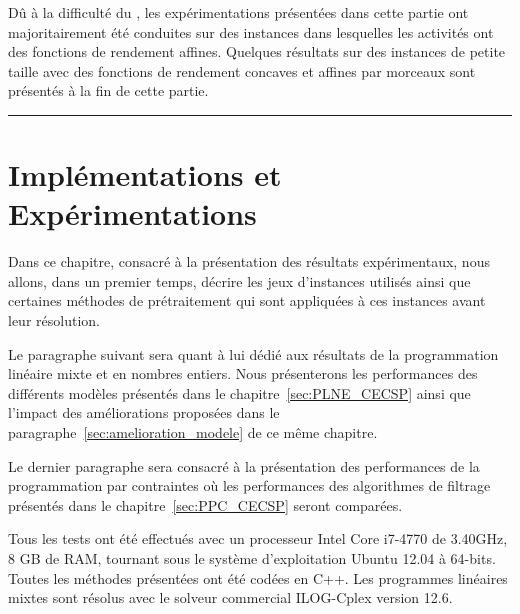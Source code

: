 \begin{center}
\begin{minipage}{\textwidth}
{    Dû à la difficulté du \CECSP, les expérimentations présentées
    dans cette partie ont majoritairement été conduites sur des
    instances dans lesquelles les activités ont des fonctions de
    rendement affines. Quelques résultats sur des instances de petite
    taille avec des fonctions de rendement concaves et affines par
    morceaux sont présentés à la fin de cette partie.}
    \vspace{0.5cm}
    \hrule
  \end{minipage}
\end{center}

\chapter{Implémentations et Expérimentations}
\label{sec:expe}

Dans ce chapitre, consacré à la présentation des résultats
expérimentaux, nous allons, dans un premier temps, décrire les
jeux d'instances utilisés ainsi que certaines méthodes de
prétraitement qui sont appliquées à ces instances avant leur
résolution. 

Le paragraphe suivant sera quant à lui dédié aux résultats de la
programmation linéaire mixte et en nombres entiers. Nous présenterons
les performances des différents modèles présentés dans le
chapitre~\ref{sec:PLNE_CECSP} ainsi que l'impact des améliorations
proposées dans le paragraphe~\ref{sec:amelioration_modele} de ce même
chapitre. 

Le dernier paragraphe sera consacré à la présentation des performances
de la programmation par contraintes où les performances des
algorithmes de filtrage présentés dans le chapitre~\ref{sec:PPC_CECSP}
seront comparées. 

Tous les tests ont été effectués avec un processeur Intel Core i7-4770
de 3.40GHz, 8 GB de RAM, tournant sous le système d’exploitation
Ubuntu 12.04 à 64-bits. Toutes les méthodes présentées ont été codées
en C++. Les programmes linéaires mixtes sont résolus avec le solveur
commercial ILOG-Cplex version 12.6.











